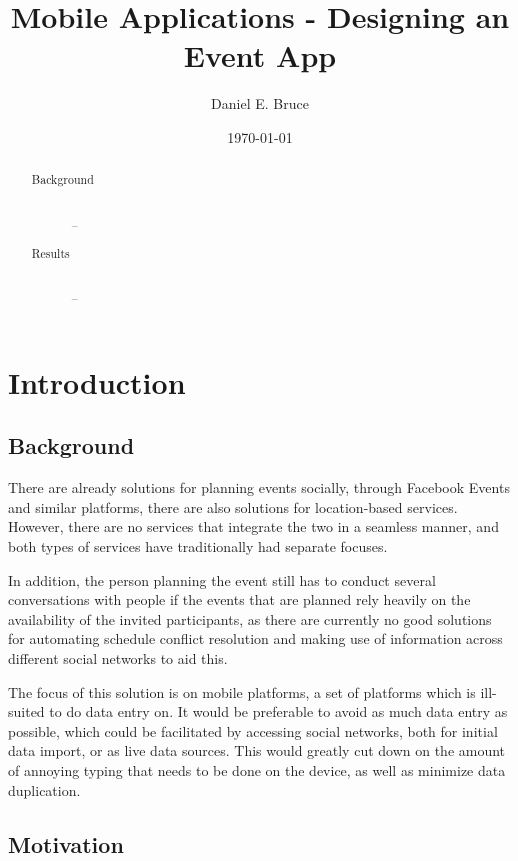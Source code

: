 \documentclass[]{report}
\begin{document}
\title{Mobile Applications - Designing an Event App}
\author{Daniel E. Bruce}
\date{\today}
\maketitle

\begin{abstract}
  \begin{description}
    \item[Background] \hfill \\
      --
    \item[Results] \hfill \\
      --
  \end{description}
\end{abstract}

\tableofcontents

\chapter{Introduction}

\section{Background}

There are already solutions for planning events socially, through Facebook
Events and similar platforms, there are also solutions for location-based
services. However, there are no services that integrate the two in a seamless
manner, and both types of services have traditionally had separate focuses.

In addition, the person planning the event still has to conduct several
conversations with people if the events that are planned rely heavily on the
availability of the invited participants, as there are currently no good
solutions for automating schedule conflict resolution and making use of
information across different social networks to aid this.

The focus of this solution is on mobile platforms, a set of platforms which is
ill-suited to do data entry on\cite{brown:fourkey}. It would be preferable to
avoid as much data entry as possible, which could be facilitated by accessing
social networks, both for initial data import, or as live data sources. This
would greatly cut down on the amount of annoying typing that needs to be done on
the device, as well as minimize data duplication.

\section{Motivation}
\end{document}
